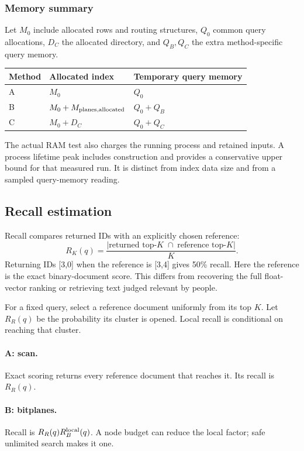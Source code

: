 \subsubsection*{Memory summary}
Let $M_0$ include allocated rows and routing structures, $Q_0$ common query allocations,
$D_C$ the allocated directory, and $Q_B,Q_C$ the extra method-specific query memory.
\begin{center}
\begin{tabular}{@{}lll@{}}\toprule
Method & Allocated index & Temporary query memory\\\midrule
A & $M_0$ & $Q_0$\\
B & $M_0+M_{\rm planes,allocated}$ & $Q_0+Q_B$\\
C & $M_0+D_C$ & $Q_0+Q_C$\\\bottomrule
\end{tabular}
\end{center}
The actual RAM test also charges the running process and retained inputs. A process lifetime
peak includes construction and provides a conservative upper bound for that measured run.
It is distinct from index data size and from a sampled query-memory reading.

\newpage
\subsection{Recall estimation}
Recall compares returned IDs with an explicitly chosen reference:
\begin{equation}
 R_K(q)=\frac{|\text{returned top-}K\;\cap\;\text{reference top-}K|}{K}.
 \label{eq:recall}
\end{equation}
Returning IDs [3,0] when the reference is [3,4] gives 50\% recall. Here the reference is the
exact binary-document score. This differs from recovering the full float-vector ranking or
retrieving text judged relevant by people.

For a fixed query, select a reference document uniformly from its top $K$. Let $R_R(q)$ be
the probability its cluster is opened. Local recall is conditional on reaching that cluster.

\paragraph{A: scan.} Exact scoring returns every reference document that reaches it.
Its recall is $R_R(q)$.

\paragraph{B: bitplanes.} Recall is $R_R(q)R_B^{\rm local}(q)$. A node budget can reduce
the local factor; safe unlimited search makes it one.


